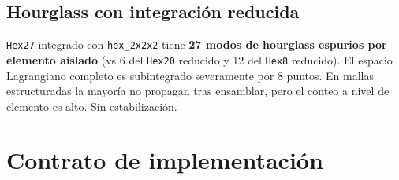 \documentclass[11pt,letterpaper,oneside]{report}
\begin{document}
\subsection{Hourglass con integración reducida}

\texttt{Hex27} integrado con \texttt{hex\_2x2x2} tiene \textbf{27 modos de hourglass espurios por elemento aislado} (vs 6 del \texttt{Hex20} reducido y 12 del \texttt{Hex8} reducido). El espacio Lagrangiano completo es subintegrado severamente por 8 puntos. En mallas estructuradas la mayoría no propagan tras ensamblar, pero el conteo a nivel de elemento es alto. Sin estabilización.


\section{Contrato de implementación}
\end{document}

